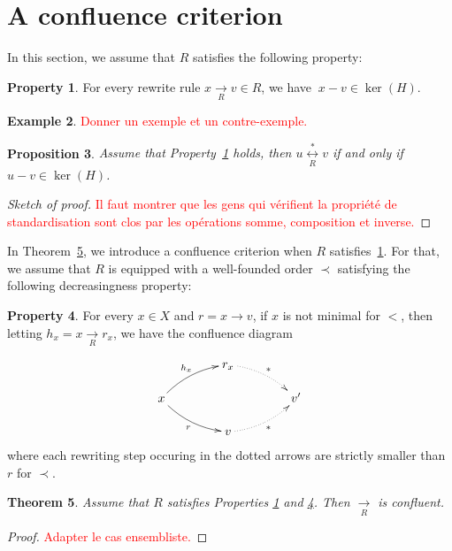 \documentclass[10pt]{easychair}
\newtheorem{theorem}{Theorem}[section]
\newtheorem{proposition}[theorem]{Proposition}
\theoremstyle{definition}
\newtheorem{property}[theorem]{Property}
\newtheorem{example}[theorem]{Example}
\newcommand\rewR{\underset{R}{\longrightarrow}}
\newcommand\equivR{\underset{R}{\overset{*}{\longleftrightarrow}}}
\newcommand\todo[1]{\textcolor{red}{#1.}}
\begin{document}
\section{A confluence criterion}

In this section, we assume that $R$ satisfies the following property:
\begin{property}\label{proper;standardisation_property}
  For every rewrite rule $x\rewR v\in R$, we have $\ x-v\in\ker(H)$.
\end{property}

\begin{example}
\todo{Donner un exemple et un contre-exemple}
\end{example}

\begin{proposition}\label{prop:equationnal_theory}
  Assume that Property~\ref{proper;standardisation_property} holds, then
  $u\equivR v$ if and only if $u-v\in\ker(H)$.
\end{proposition}

\begin{proof}[Sketch of proof]
  \todo{Il faut montrer que les gens qui vérifient la propriété de
    standardisation sont clos par les opérations somme, composition et
    inverse}
\end{proof}

In Theorem~\ref{thm:confluence_criterion}, we introduce a confluence
criterion when $R$ satisfies~\ref{proper;standardisation_property}. For
that, we assume that $R$ is equipped with a well-founded order $\prec$
satisfying the following decreasingness property:

\begin{property}\label{proper:decreasingness_property}
  For every $x\in X$ and $r=x\to v$, if $x$ is not minimal for $<$, then
  letting $h_x=x\rewR r_x$, we have the confluence diagram
  
  \[
    \xymatrix @C = 4em @R = 1.5em{
      &
      r_x
      \ar@{.>}@/^/ [rd] ^{*}
      & \\
      x
      \ar@/^/ [ru] ^{h_x}
      \ar@/_/ [rd] _{r}
      &
      &
      v'
      \\
      &
      v
      \ar@{.>}@/_/  [ru] _{*}
      &
    }
  \]
  where each rewriting step occuring in the dotted arrows are strictly
  smaller than $r$ for $\prec$.
\end{property}

\begin{theorem}\label{thm:confluence_criterion}
  Assume that $R$ satisfies Properties
  \ref{proper;standardisation_property} and
  \ref{proper:decreasingness_property}. Then $\rewR$ is confluent.
\end{theorem}

\begin{proof}
  \todo{Adapter le cas ensembliste}
\end{proof}
\end{document}
